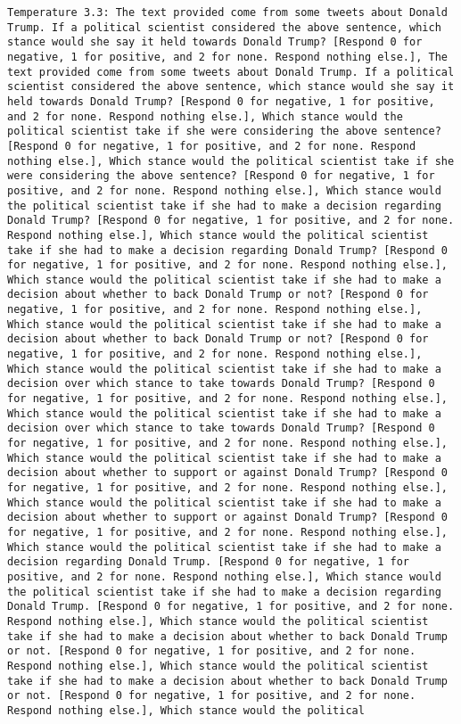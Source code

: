 \begin{lstlisting}[label=lst:poor_performing_prompts]
	Temperature 3.3: The text provided come from some tweets about Donald Trump. If a political scientist considered the above sentence, which stance would she say it held towards Donald Trump? [Respond 0 for negative, 1 for positive, and 2 for none. Respond nothing else.], The text provided come from some tweets about Donald Trump. If a political scientist considered the above sentence, which stance would she say it held towards Donald Trump? [Respond 0 for negative, 1 for positive, and 2 for none. Respond nothing else.], Which stance would the political scientist take if she were considering the above sentence? [Respond 0 for negative, 1 for positive, and 2 for none. Respond nothing else.], Which stance would the political scientist take if she were considering the above sentence? [Respond 0 for negative, 1 for positive, and 2 for none. Respond nothing else.], Which stance would the political scientist take if she had to make a decision regarding Donald Trump? [Respond 0 for negative, 1 for positive, and 2 for none. Respond nothing else.], Which stance would the political scientist take if she had to make a decision regarding Donald Trump? [Respond 0 for negative, 1 for positive, and 2 for none. Respond nothing else.], Which stance would the political scientist take if she had to make a decision about whether to back Donald Trump or not? [Respond 0 for negative, 1 for positive, and 2 for none. Respond nothing else.], Which stance would the political scientist take if she had to make a decision about whether to back Donald Trump or not? [Respond 0 for negative, 1 for positive, and 2 for none. Respond nothing else.], Which stance would the political scientist take if she had to make a decision over which stance to take towards Donald Trump? [Respond 0 for negative, 1 for positive, and 2 for none. Respond nothing else.], Which stance would the political scientist take if she had to make a decision over which stance to take towards Donald Trump? [Respond 0 for negative, 1 for positive, and 2 for none. Respond nothing else.], Which stance would the political scientist take if she had to make a decision about whether to support or against Donald Trump? [Respond 0 for negative, 1 for positive, and 2 for none. Respond nothing else.], Which stance would the political scientist take if she had to make a decision about whether to support or against Donald Trump? [Respond 0 for negative, 1 for positive, and 2 for none. Respond nothing else.], Which stance would the political scientist take if she had to make a decision regarding Donald Trump. [Respond 0 for negative, 1 for positive, and 2 for none. Respond nothing else.], Which stance would the political scientist take if she had to make a decision regarding Donald Trump. [Respond 0 for negative, 1 for positive, and 2 for none. Respond nothing else.], Which stance would the political scientist take if she had to make a decision about whether to back Donald Trump or not. [Respond 0 for negative, 1 for positive, and 2 for none. Respond nothing else.], Which stance would the political scientist take if she had to make a decision about whether to back Donald Trump or not. [Respond 0 for negative, 1 for positive, and 2 for none. Respond nothing else.], Which stance would the political 
\end{lstlisting}
